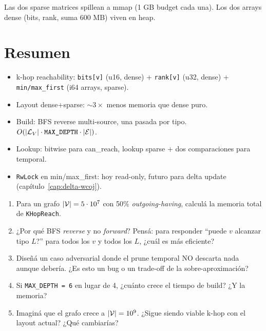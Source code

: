 \noindent
Las dos sparse matrices spillean a mmap (1 GB budget cada una).
Los dos arrays dense (bits, rank, suma 600 MB) viven en heap.

\section{Resumen}

\begin{itemize}
    \item k-hop reachability: \texttt{bits[v]} (u16, dense) +
    \texttt{rank[v]} (u32, dense) + \texttt{min/max\_first} (i64
    arrays, sparse).
    \item Layout dense+sparse: \(\sim 3\times\) menos memoria que
    dense puro.
    \item Build: BFS reverse multi-source, una pasada por tipo.
    \(O(|\mathcal{L}_V| \cdot \texttt{MAX\_DEPTH} \cdot |\mathcal{E}|)\).
    \item Lookup: bitwise para can\_reach, lookup sparse + dos
    comparaciones para temporal.
    \item \texttt{RwLock} en min/max\_first: hoy read-only, futuro
    para delta update (capítulo~\ref{cap:delta-wcoj}).
\end{itemize}

\begin{ejercicios}
\begin{enumerate}
    \item \starred{} Para un grafo \(|\mathcal{V}| = 5 \cdot 10^7\) con
    50\% \emph{outgoing-having}, calculá la memoria total de
    \texttt{KHopReach}.

    \item ¿Por qué BFS \emph{reverse} y no \emph{forward}? Pensá:
    para responder ``puede \(v\) alcanzar tipo \(L\)?'' para todos
    los \(v\) y todos los \(L\), ¿cuál es más eficiente?

    \item \starred{} Diseñá un caso adversarial donde el prune
    temporal NO descarta nada aunque debería. ¿Es esto un bug o un
    trade-off de la sobre-aproximación?

    \item Si \texttt{MAX\_DEPTH = 6} en lugar de 4, ¿cuánto crece
    el tiempo de build? ¿Y la memoria?

    \item Imaginá que el grafo crece a \(|\mathcal{V}| = 10^9\). ¿Sigue
    siendo viable k-hop con el layout actual? ¿Qué cambiarías?
\end{enumerate}
\end{ejercicios}
